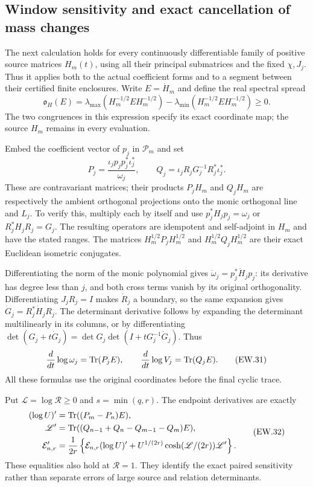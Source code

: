 \subsection{Window sensitivity and exact cancellation of mass changes}

The next calculation holds for every continuously differentiable family of positive
source matrices $H_m(t)$, using all their principal submatrices and
the fixed $\chi,J_j$. Thus it applies both to the actual coefficient
forms and to a segment between their certified finite enclosures.
Write $E=\dot H_m$ and define the real spectral spread
\[
 \mathfrak o_H(E)=\lambda_{\max}(H_m^{-1/2}EH_m^{-1/2})
                -\lambda_{\min}(H_m^{-1/2}EH_m^{-1/2})\ge0.
                                                               \tag{EW.29}
\]
The two congruences in this expression specify its exact coordinate
map; the source $H_m$ remains in every evaluation.

Embed the coefficient vector of $p_j$ in $\mathcal P_m$ and set
\[
 P_j=\frac{\iota_jp_jp_j^*\iota_j^*}{\omega_j},\qquad
 Q_j=\iota_jR_jG_j^{-1}R_j^*\iota_j^*.
                                                               \tag{EW.30}
\]
These are contravariant matrices; their products $P_jH_m$ and
$Q_jH_m$ are respectively the ambient orthogonal projections onto
the monic orthogonal line and $L_j$. To verify this, multiply each
by itself and use $p_j^*H_jp_j=\omega_j$ or
$R_j^*H_jR_j=G_j$. The resulting operators are idempotent and
self-adjoint in $H_m$ and have the stated ranges. The matrices
$H_m^{1/2}P_jH_m^{1/2}$ and $H_m^{1/2}Q_jH_m^{1/2}$ are their
exact Euclidean isometric conjugates.

Differentiating the norm of the monic polynomial gives
$\dot\omega_j=p_j^*\dot H_jp_j$: its derivative has degree less
than $j$, and both cross terms vanish by its original orthogonality.
Differentiating $J_jR_j=I$ makes $\dot R_j$ a boundary, so the
same expansion gives $\dot G_j=R_j^*\dot H_jR_j$.
The determinant derivative follows by expanding the determinant
multilinearly in its columns, or by differentiating
$\det(G_j+t\dot G_j)=\det G_j\det(I+tG_j^{-1}\dot G_j)$.
Thus
\[
 \frac d{dt}\log\omega_j=\operatorname{Tr}(P_jE),\qquad
 \frac d{dt}\log V_j=\operatorname{Tr}(Q_jE).                             \tag{EW.31}
\]
All these formulas use the original coordinates before the final
cyclic trace.

Put $\mathscr L=\log\mathscr R\ge0$ and $s=\min(q,r)$.
The endpoint derivatives are exactly
\[
 \begin{split}
 (\log U)'&=\operatorname{Tr}((P_m-P_n)E),\\
 \mathscr L'&=\operatorname{Tr}((Q_{n-1}+Q_n-Q_{m-1}-Q_m)E),\\
 \mathcal E_{n,r}'&=\frac1{2r}\left\{
 \mathcal E_{n,r}(\log U)'
 +U^{1/(2r)}\cosh(\mathscr L/(2r))\mathscr L'\right\}.
 \end{split}                                                   \tag{EW.32}
\]
These equalities also hold at $\mathscr R=1$. They identify the
exact paired sensitivity rather than separate errors of large source
and relation determinants.

